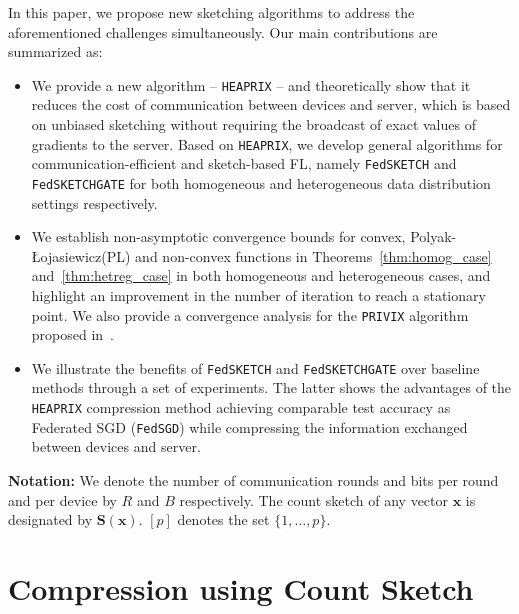 \documentclass{article}
\newcommand{\pl}{Polyak-\L{}ojasiewicz}
\begin{document}
 In this paper, we propose new sketching algorithms to address the aforementioned challenges simultaneously.
 Our main contributions are summarized as:
\begin{itemize}
    \item We provide a new algorithm -- \texttt{HEAPRIX} -- and theoretically show that it reduces the cost of communication between devices and server, which is based on unbiased sketching without requiring the broadcast of exact values of gradients to the server. 
    Based on \texttt{HEAPRIX}, we develop general algorithms for communication-efficient and sketch-based FL, namely \texttt{FedSKETCH} and \texttt{FedSKETCHGATE} for both homogeneous and heterogeneous data distribution settings respectively.
    \item We establish non-asymptotic convergence bounds for convex, \pl\:(PL) and non-convex functions in Theorems~\ref{thm:homog_case} and~\ref{thm:hetreg_case} in both homogeneous and heterogeneous cases, and highlight an improvement in the number of iteration to reach a stationary point.
We also provide a convergence analysis for the \texttt{PRIVIX} algorithm proposed in~\citet{li2019privacy}.
    \item We illustrate the benefits of \texttt{FedSKETCH} and \texttt{FedSKETCHGATE} over baseline methods through a set of experiments. 
    The latter shows the advantages of the \texttt{HEAPRIX} compression method achieving comparable test accuracy as Federated SGD (\texttt{FedSGD}) while compressing the information exchanged between devices and server.
\end{itemize}


\noindent\textbf{Notation:} 
We denote the number of communication rounds and bits per round and per device by $R$ and $B$ respectively. 
The count sketch of any vector $\boldsymbol{x}$ is designated by $\mathbf{S}(\boldsymbol{x})$. $[p]$ denotes the set $\{1,\dots,p\}$.

\vspace{-0.05in}
\section{Compression using Count Sketch}\label{sec:compression}
\vspace{-0.05in}
\end{document}
